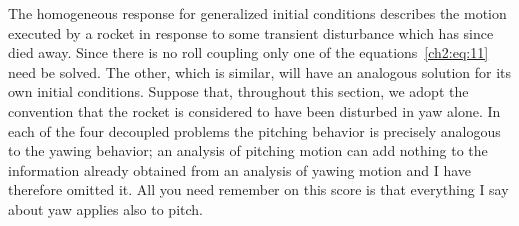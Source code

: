 The homogeneous response for generalized initial conditions describes the
motion executed by a rocket in response to some transient disturbance which has
since died away. Since there is no roll coupling only one of the
equations~\eqref{ch2:eq:11} need be solved. The other, which is similar, will
have an analogous solution for its own initial conditions. Suppose that,
throughout this section, we adopt the convention that the rocket is considered
to have been disturbed in yaw alone. In each of the four decoupled problems the
pitching behavior is precisely analogous to the yawing behavior; an analysis of
pitching motion can add nothing to the information already obtained from an
analysis of yawing motion and I have therefore omitted it. All you need
remember on this score is that everything I say about yaw applies also to
pitch.

